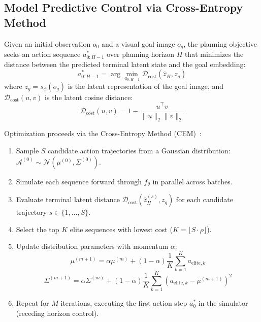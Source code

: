 \documentclass[10pt,journal,compsoc]{IEEEtran}
\begin{document}
\subsection{Model Predictive Control via Cross-Entropy Method}

Given an initial observation $o_0$ and a visual goal image $o_g$, the planning objective seeks an action sequence $a_{0:H-1}^*$ over planning horizon $H$ that minimizes the distance between the predicted terminal latent state and the goal embedding:
\begin{equation}
    a_{0:H-1}^* = \arg\min_{a_{0:H-1}} \mathcal{D}_{\text{cost}}\left( \hat{z}_H, z_g \right)
\end{equation}
where $z_g = s_\phi(o_g)$ is the latent representation of the goal image, and $\mathcal{D}_{\text{cost}}(u, v)$ is the latent cosine distance:
\begin{equation}
    \mathcal{D}_{\text{cost}}(u, v) = 1 - \frac{u^\top v}{\|u\|_2 \|v\|_2}
\end{equation}

Optimization proceeds via the Cross-Entropy Method (CEM)~\cite{rubinstein1999cem}:
\begin{enumerate}
    \item Sample $S$ candidate action trajectories from a Gaussian distribution: $\mathcal{A}^{(0)} \sim \mathcal{N}(\mu^{(0)}, \Sigma^{(0)})$.
    \item Simulate each sequence forward through $f_\theta$ in parallel across batches.
    \item Evaluate terminal latent distance $\mathcal{D}_{\text{cost}}(\hat{z}_H^{(s)}, z_g)$ for each candidate trajectory $s \in \{1, \dots, S\}$.
    \item Select the top $K$ elite sequences with lowest cost ($K = \lfloor S \cdot \rho \rfloor$).
    \item Update distribution parameters with momentum $\alpha$:
    \begin{equation}
        \mu^{(m+1)} = \alpha \mu^{(m)} + (1 - \alpha) \frac{1}{K} \sum_{k=1}^K a_{\text{elite}, k}
    \end{equation}
    \begin{equation}
        \Sigma^{(m+1)} = \alpha \Sigma^{(m)} + (1 - \alpha) \frac{1}{K} \sum_{k=1}^K (a_{\text{elite}, k} - \mu^{(m+1)})^2
    \end{equation}
    \item Repeat for $M$ iterations, executing the first action step $a_0^*$ in the simulator (receding horizon control).
\end{enumerate}
\end{document}
